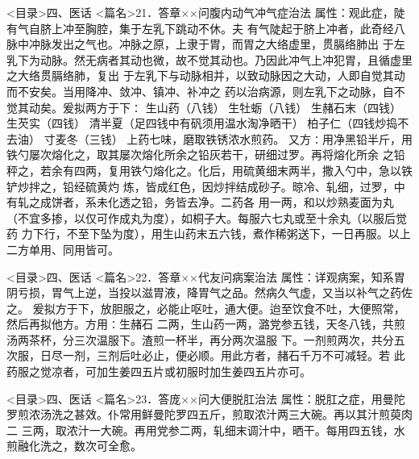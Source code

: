 \documentclass[a4paper,12pt,UTF8,twoside]{ctexbook}
\begin{document}
<目录>四、医话
<篇名>21．答章××问腹内动气冲气症治法
属性：观此症，陡有气自脐上冲至胸腔，集于左乳下跳动不休。夫 
有气陡起于脐上冲者，此奇经八脉中冲脉发出之气也。冲脉之原，上隶于胃，而胃之大络虚里，贯膈络肺出 
于左乳下为动脉。然无病者其动也微，故不觉其动也。乃因此冲气上冲犯胃，且循虚里之大络贯膈络肺，复出 
于左乳下与动脉相并，以致动脉因之大动，人即自觉其动而不安矣。当用降冲、敛冲、镇冲、补冲之 
药以治病源，则左乳下之动脉，自不觉其动矣。爰拟两方于下∶ 
生山药（八钱） 生牡蛎（八钱） 生赭石末（四钱） 生芡实（四钱） 
清半夏（足四钱中有矾须用温水淘净晒干） 柏子仁（四钱炒捣不去油） 寸麦冬（三钱） 
上药七味，磨取铁锈浓水煎药。 
又方∶用净黑铅半斤，用铁勺屡次熔化之，取其屡次熔化所余之铅灰若干，研细过罗。再将熔化所余 
之铅秤之，若余有四两，复用铁勺熔化之。化后，用硫黄细末两半，撒入勺中，急以铁铲炒拌之，铅经硫黄灼 
炼，皆成红色，因炒拌结成砂子。晾冷、轧细，过罗，中有轧之成饼者，系未化透之铅，务皆去净。二药各 
用一两，和以炒熟麦面为丸（不宜多掺，以仅可作成丸为度），如桐子大。每服六七丸或至十余丸（以服后觉药 
力下行，不至下坠为度），用生山药末五六钱，煮作稀粥送下，一日再服。以上二方单用、同用皆可。 

<目录>四、医话
<篇名>22．答章××代友问病案治法
属性：详观病案，知系胃阴亏损，胃气上逆，当投以滋胃液，降胃气之品。然病久气虚，又当以补气之药佐之。 
爰拟方于下，放胆服之，必能止呕吐，通大便。迨至饮食不吐，大便照常，然后再拟他方。方用∶生赭石 
二两，生山药一两，潞党参五钱，天冬八钱，共煎汤两茶杯，分三次温服下。渣煎一杯半，再分两次温服 
下。一剂煎两次，共分五次服，日尽一剂，三剂后吐必止，便必顺。用此方者，赭石千万不可减轻。若 
此药服之觉凉者，可加生姜四五片或初服时加生姜四五片亦可。 

<目录>四、医话
<篇名>23．答庞××问大便脱肛治法
属性：脱肛之症，用曼陀罗煎浓汤洗之甚效。仆常用鲜曼陀罗四五斤，煎取浓汁两三大碗。再以其汁煎萸肉二 
三两，取浓汁一大碗。再用党参二两，轧细末调汁中，晒干。每用四五钱，水煎融化洗之，数次可全愈。 
\end{document}
